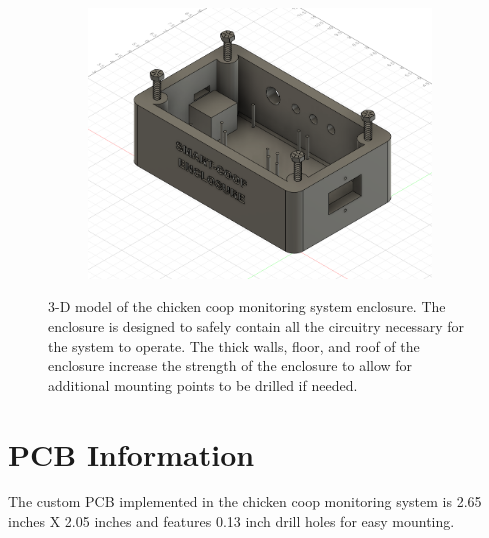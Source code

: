 \documentclass{article}
\begin{document}
\begin{figure}[H]
\begin{subfigure}[b]{0.45\textwidth}
        \includegraphics[width=\linewidth]{fig/enclosure-3.png}
        \caption[]%
        {}
    \end{subfigure} 
    \hfill
    \caption{3-D model of the chicken coop monitoring system enclosure. The enclosure is designed to safely contain all the circuitry necessary for the system to operate.  The thick walls, floor, and roof of the enclosure increase the strength of the enclosure to allow for additional mounting points to be drilled if needed.} 
    \label{fig:enclosure-model}
\end{figure}

\newpage

\section{PCB Information}
The custom PCB implemented in the chicken coop monitoring system is 2.65 inches X 2.05 inches and features 0.13 inch drill holes for easy mounting.
\end{document}
